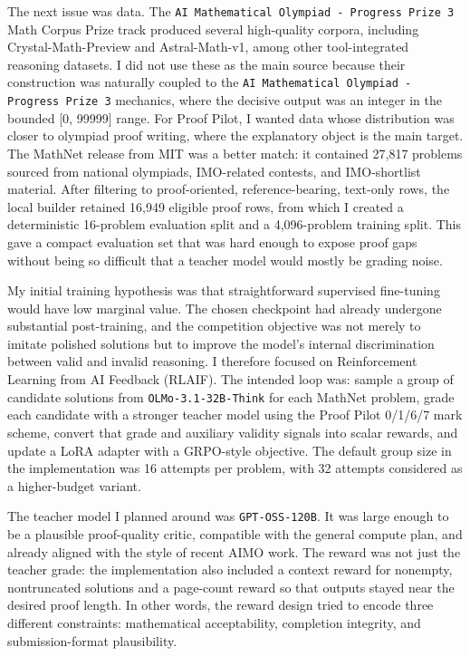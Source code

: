 The next issue was data. The \texttt{AI Mathematical Olympiad - Progress Prize 3} Math Corpus Prize track produced several high-quality corpora, including Crystal-Math-Preview and Astral-Math-v1, among other tool-integrated reasoning datasets. I did not use these as the main source because their construction was naturally coupled to the \texttt{AI Mathematical Olympiad - Progress Prize 3} mechanics, where the decisive output was an integer in the bounded [0, 99999] range. For Proof Pilot, I wanted data whose distribution was closer to olympiad proof writing, where the explanatory object is the main target. The MathNet release from MIT was a better match: it contained 27,817 problems sourced from national olympiads, IMO-related contests, and IMO-shortlist material. After filtering to proof-oriented, reference-bearing, text-only rows, the local builder retained 16,949 eligible proof rows, from which I created a deterministic 16-problem evaluation split and a 4,096-problem training split. This gave a compact evaluation set that was hard enough to expose proof gaps without being so difficult that a teacher model would mostly be grading noise.

My initial training hypothesis was that straightforward supervised fine-tuning would have low marginal value. The chosen checkpoint had already undergone substantial post-training, and the competition objective was not merely to imitate polished solutions but to improve the model's internal discrimination between valid and invalid reasoning. I therefore focused on Reinforcement Learning from AI Feedback (RLAIF). The intended loop was: sample a group of candidate solutions from \texttt{OLMo-3.1-32B-Think} for each MathNet problem, grade each candidate with a stronger teacher model using the Proof Pilot 0/1/6/7 mark scheme, convert that grade and auxiliary validity signals into scalar rewards, and update a LoRA adapter with a GRPO-style objective. The default group size in the implementation was 16 attempts per problem, with 32 attempts considered as a higher-budget variant.

The teacher model I planned around was \texttt{GPT-OSS-120B}. It was large enough to be a plausible proof-quality critic, compatible with the general compute plan, and already aligned with the style of recent AIMO work. The reward was not just the teacher grade: the implementation also included a context reward for nonempty, nontruncated solutions and a page-count reward so that outputs stayed near the desired proof length. In other words, the reward design tried to encode three different constraints: mathematical acceptability, completion integrity, and submission-format plausibility.

